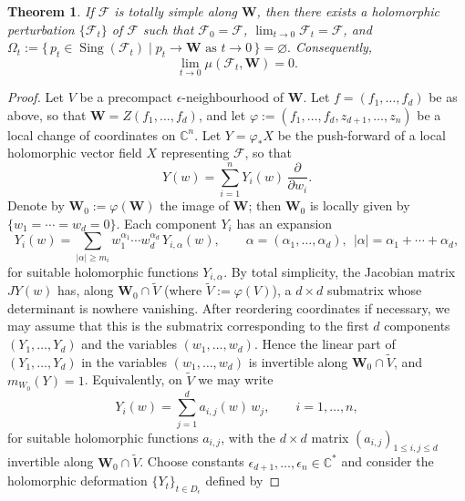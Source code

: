 \documentclass[10pt,twoside]{amsart}
\numberwithin{equation}{section}
\newtheorem{theorem}[proposition]{Theorem}
\theoremstyle{definition}
\theoremstyle{remark}
\DeclareMathOperator{\sing}{Sing}
\newcommand{\C}{\mathbb{C}}
\newcommand{\fol}{\mathcal{F}}
\newcommand{\W}{\mathbf{W}}
\begin{document}
\begin{theorem}\label{thm:totally-simple-perturbation}
If $\fol$ is totally simple along $\W$, then there exists a holomorphic perturbation $\{\fol_t\}$ of $\fol$
such that $\fol_0=\fol$, $\lim_{t\to0}\fol_t=\fol$, and
$
\Omega_t:=\{\,p_t\in \sing(\fol_t)\mid p_t\to \W \text{ as } t\to0\,\}=\varnothing.
$
Consequently,
\begin{equation}\label{eq:totally-simple-mu-zero}
\lim_{t\to 0}\mu(\fol_t,\W)=0.
\end{equation}
\end{theorem}

\begin{proof}
Let $V$ be a precompact $\epsilon$-neighbourhood of $\W$.
Let $f=(f_1,\ldots,f_d)$ be as above, so that $\W=Z(f_1,\ldots,f_d)$, and let
$
\varphi:=(f_1,\ldots,f_d,z_{d+1},\ldots,z_n)
$
be a local change of coordinates on $\C^n$.
Let $Y=\varphi_*X$ be the push-forward of a local holomorphic vector field $X$ representing $\fol$, so that
\[
Y(w)=\sum_{i=1}^n Y_i(w)\,\frac{\partial}{\partial w_i}.
\]
Denote by $\W_0:=\varphi(\W)$ the image of $\W$; then $\W_0$ is locally given by $\{w_1=\cdots=w_d=0\}$.
Each component $Y_i$ has an expansion
\begin{equation}\label{eq:Yi-expansion}
Y_i(w)=\sum_{|\alpha|\geq m_i} w_1^{\alpha_1}\cdots w_d^{\alpha_d}\,Y_{i,\alpha}(w),
\qquad
\alpha=(\alpha_1,\ldots,\alpha_d),\ \ |\alpha|=\alpha_1+\cdots+\alpha_d,
\end{equation}
for suitable holomorphic functions $Y_{i,\alpha}$.
By total simplicity, the Jacobian matrix $JY(w)$ has, along $\W_0\cap \widetilde V$ (where $\widetilde V:=\varphi(V)$),
a $d\times d$ submatrix whose determinant is nowhere vanishing. After reordering coordinates if necessary,
we may assume that this is the submatrix corresponding to the first $d$ components $(Y_1,\ldots,Y_d)$
and the variables $(w_1,\ldots,w_d)$. Hence the linear part of $(Y_1,\ldots,Y_d)$ in the variables $(w_1,\ldots,w_d)$ is invertible along $\W_0\cap\widetilde V$, and $m_{W_0}(Y)=1$.
Equivalently, on $\widetilde V$ we may write
\begin{equation}\label{eq:Yi-linear}
Y_i(w)=\sum_{j=1}^d a_{i,j}(w)\,w_j,
\qquad i=1,\ldots,n,
\end{equation}
for suitable holomorphic functions $a_{i,j}$, with the $d\times d$ matrix $(a_{i,j})_{1\leq i,j\leq d}$
invertible along $\W_0\cap\widetilde V$.
Choose constants $\epsilon_{d+1},\ldots,\epsilon_n\in\C^*$ and consider the holomorphic deformation
$\{Y_t\}_{t\in D_\epsilon}$ defined by

\end{proof}
\end{document}
